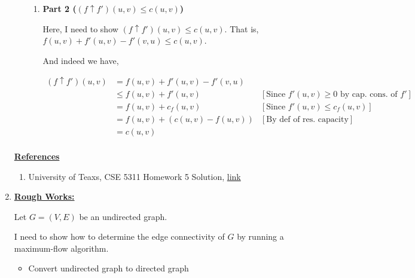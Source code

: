 \documentclass[12pt]{article}
\begin{document}
\begin{enumerate}[1.]
\begin{itemize}
\begin{enumerate}[1.]
            \item \textbf{Part 2 ($(f \uparrow f')(u,v) \leq c(u,v)$)}

            Here, I need to show $(f \uparrow f')(u,v) \leq c(u,v)$. That is,
            $f(u,v) + f'(u,v) - f'(v,u) \leq c(u,v)$.

            \bigskip

            And indeed we have,

            \begin{align}
            (f \uparrow f')(u,v) &= f(u,v)+ f'(u,v) - f'(v,u)\\
            &\leq f(u,v)+ f'(u,v) & [\text{Since $f'(u,v) \geq 0$ by cap. cons. of $f'$}]\\
            &= f(u,v)+ c_f(u,v) & [\text{Since $f'(u,v) \leq c_f(u,v)$}]\\
            &= f(u,v) + (c(u,v) - f(u,v)) & [\text{By def of res. capacity}]\\
            &= c(u,v)\\
            \end{align}

        \end{enumerate}

    \end{itemize}

    \bigskip

    \underline{\textbf{References}}

    \bigskip

    \begin{enumerate}[1)]
        \item University of Teaxs, CSE 5311 Homework 5 Solution, \href{http://ranger.uta.edu/~huang/teaching/CSE5311/HW5_Solution.pdf}{link}
    \end{enumerate}

    \item

    \bigskip

    \underline{\textbf{Rough Works:}}

    Let $G=(V,E)$ be an undirected graph.

    \bigskip

    I need to show how to determine the edge connectivity of $G$ by running a
    maximum-flow algorithm.

    \begin{itemize}

        \item Convert undirected graph to directed graph


\end{itemize}
\end{enumerate}
\end{document}
